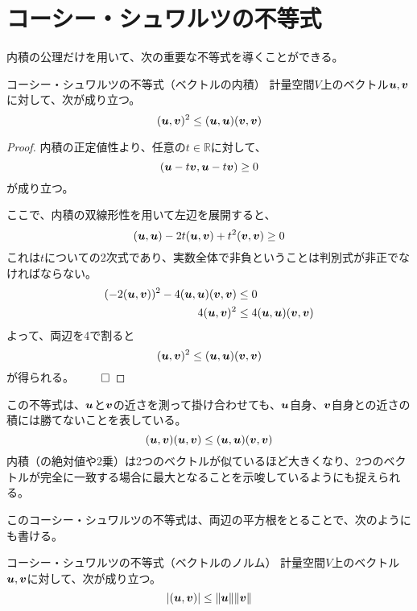 \documentclass[../../../topic_linear-algebra]{subfiles}
\begin{document}
\sectionline
\section{コーシー・シュワルツの不等式}

内積の公理だけを用いて、次の重要な不等式を導くことができる。

\begin{theorem}{コーシー・シュワルツの不等式（ベクトルの内積）}
  計量空間$V$上のベクトル$\vb*{u}, \vb*{v}$に対して、次が成り立つ。
  \begin{equation*}
    (\vb*{u}, \vb*{v})^2 \leq (\vb*{u}, \vb*{u}) (\vb*{v}, \vb*{v})
  \end{equation*}
\end{theorem}

\begin{proof}
  内積の正定値性より、任意の$t\in \mathbb{R}$に対して、
  \begin{equation*}
    (\vb*{u} - t\vb*{v}, \vb*{u} - t\vb*{v}) \geq 0
  \end{equation*}
  が成り立つ。

  ここで、内積の双線形性を用いて左辺を展開すると、
  \begin{equation*}
    (\vb*{u}, \vb*{u}) - 2t(\vb*{u}, \vb*{v}) + t^2(\vb*{v}, \vb*{v}) \geq 0
  \end{equation*}
  これは$t$についての2次式であり、実数全体で非負ということは判別式が非正でなければならない。
  \begin{align*}
    (-2(\vb*{u}, \vb*{v}))^2 - 4(\vb*{u}, \vb*{u})(\vb*{v}, \vb*{v}) & \leq 0                                     \\
    4(\vb*{u}, \vb*{v})^2                                            & \leq 4(\vb*{u}, \vb*{u})(\vb*{v}, \vb*{v})
  \end{align*}
  よって、両辺を4で割ると
  \begin{equation*}
    (\vb*{u}, \vb*{v})^2 \leq (\vb*{u}, \vb*{u})(\vb*{v}, \vb*{v})
  \end{equation*}
  が得られる。 $\qed$
\end{proof}

この不等式は、$\vb*{u}$と$\vb*{v}$の近さを測って掛け合わせても、$\vb*{u}$自身、$\vb*{v}$自身との近さの積には勝てないことを表している。
\begin{equation*}
  (\vb*{u}, \vb*{v})(\vb*{u}, \vb*{v}) \leq (\vb*{u}, \vb*{u})(\vb*{v}, \vb*{v})
\end{equation*}
内積（の絶対値や2乗）は2つのベクトルが似ているほど大きくなり、2つのベクトルが完全に一致する場合に最大となることを示唆しているようにも捉えられる。

\br

このコーシー・シュワルツの不等式は、両辺の平方根をとることで、次のようにも書ける。

\begin{theorem}{コーシー・シュワルツの不等式（ベクトルのノルム）}
  計量空間$V$上のベクトル$\vb*{u}, \vb*{v}$に対して、次が成り立つ。
  \begin{equation*}
    |(\vb*{u}, \vb*{v})| \leq \|\vb*{u}\| \|\vb*{v}\|
  \end{equation*}
\end{theorem}
\end{document}
